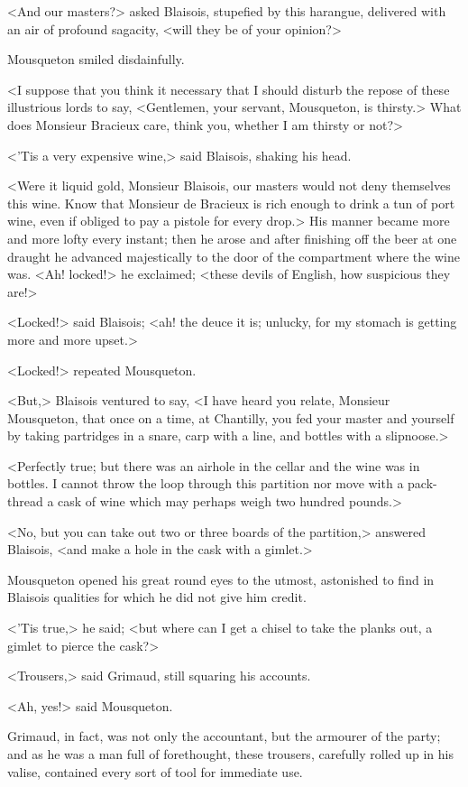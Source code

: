 <And our masters?> asked Blaisois, stupefied by this harangue, delivered with an air of profound sagacity, <will they be of your opinion?>

Mousqueton smiled disdainfully.

<I suppose that you think it necessary that I should disturb the repose of these illustrious lords to say, <Gentlemen, your servant, Mousqueton, is thirsty.> What does Monsieur Bracieux care, think you, whether I am thirsty or not?>

<'Tis a very expensive wine,> said Blaisois, shaking his head.

<Were it liquid gold, Monsieur Blaisois, our masters would not deny themselves this wine. Know that Monsieur de Bracieux is rich enough to drink a tun of port wine, even if obliged to pay a pistole for every drop.> His manner became more and more lofty every instant; then he arose and after finishing off the beer at one draught he advanced majestically to the door of the compartment where the wine was. <Ah! locked!> he exclaimed; <these devils of English, how suspicious they are!>

<Locked!> said Blaisois; <ah! the deuce it is; unlucky, for my stomach is getting more and more upset.>

<Locked!> repeated Mousqueton.

<But,> Blaisois ventured to say, <I have heard you relate, Monsieur Mousqueton, that once on a time, at Chantilly, you fed your master and yourself by taking partridges in a snare, carp with a line, and bottles with a slipnoose.>

<Perfectly true; but there was an airhole in the cellar and the wine was in bottles. I cannot throw the loop through this partition nor move with a pack-thread a cask of wine which may perhaps weigh two hundred pounds.>

<No, but you can take out two or three boards of the partition,> answered Blaisois, <and make a hole in the cask with a gimlet.>

Mousqueton opened his great round eyes to the utmost, astonished to find in Blaisois qualities for which he did not give him credit.

<'Tis true,> he said; <but where can I get a chisel to take the planks out, a gimlet to pierce the cask?>

<Trousers,> said Grimaud, still squaring his accounts.

<Ah, yes!> said Mousqueton.

Grimaud, in fact, was not only the accountant, but the armourer of the party; and as he was a man full of forethought, these trousers, carefully rolled up in his valise, contained every sort of tool for immediate use.

